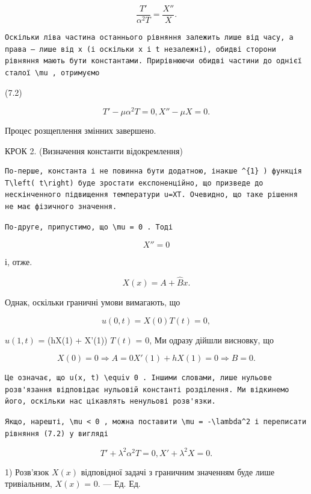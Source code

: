 \documentclass[
  ukrainian,
]{article}
\begin{document}
\[
\frac{T'}{\alpha^2 T} = \frac{X''}{X} .
\]

\begin{verbatim}
Оскільки ліва частина останнього рівняння залежить лише від часу, а права — лише від x (і оскільки x і t незалежні), обидві сторони рівняння мають бути константами. Прирівнюючи обидві частини до однієї сталої \mu , отримуємо
\end{verbatim}

(7.2)

\[
T' - \mu \alpha^{2} T = 0, X'' - \mu X = 0.
\]

Процес розщеплення змінних завершено.

КРОК 2. (Визначення константи відокремлення)

\begin{verbatim}
По-перше, константа і не повинна бути додатною, інакше ^{1} ) функція T\left( t\right) буде зростати експоненційно, що призведе до нескінченного підвищення температури u=XT. Очевидно, що таке рішення не має фізичного значення.
\end{verbatim}

\begin{verbatim}
По-друге, припустимо, що \mu = 0 . Тоді
\end{verbatim}

\[
X'' = 0
\]

і, отже.

\[
X(x) = A + \hat{B}x.
\]

Однак, оскільки граничні умови вимагають, що

\[
u(0, t) = X(0) T(t) = 0,
\]

\(u(1, t)\) = (hX(1) + X'(1)) \(T(t)\) = 0, Ми одразу дійшли висновку,
що

\[
X(0) = 0
\Rightarrow A = 0 X'(1) + hX(1) = 0 \Rightarrow B = 0 .
\]

\begin{verbatim}
Це означає, що u(x, t) \equiv 0 . Іншими словами, лише нульове розв'язання відповідає нульовій константі розділення. Ми відкинемо його, оскільки нас цікавлять ненульові розв'язки.
\end{verbatim}

\begin{verbatim}
Якщо, нарешті, \mu < 0 , можна поставити \mu = -\lambda^2 і переписати рівняння (7.2) у вигляді
\end{verbatim}

\[
T' + \lambda^2 \alpha^2 T = 0,
X' + \lambda^2 X = 0.
\]

1) Розв'язок \(X(x)\) відповідної задачі з граничним значенням буде лише
тривіальним, \(X(x)\) = 0. --- Ед. Ед.
\end{document}
